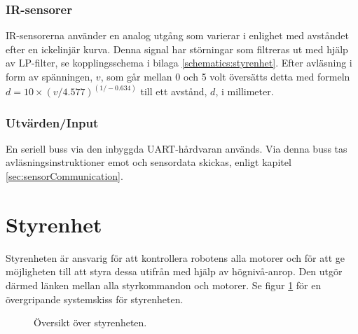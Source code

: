\documentclass[a4paper,11pt]{article}
\begin{document}
\subsubsection{IR-sensorer}
\label{ssec:ir_interface}
IR-sensorerna använder en analog utgång som varierar i enlighet med avståndet efter en ickelinjär kurva. Denna signal har störningar som filtreras ut med hjälp av LP-filter, se kopplingsschema i bilaga \ref{schematics:styrenhet}. Efter avläsning i form av spänningen, $v$, som går mellan 0 och 5 volt översätts detta med formeln $d = 10 \times (v/4.577) ^{(1/-0.634)}$ till ett avstånd, $d$, i millimeter.

\subsubsection{Utvärden/Input}
En seriell buss via den inbyggda UART-hårdvaran används. Via denna buss tas avläsningsinstruktioner emot och sensordata skickas, enligt kapitel \ref{sec:sensorCommunication}.

\clearpage
\section{Styrenhet} \label{sec:system2}
Styrenheten är ansvarig för att kontrollera robotens alla motorer och för att ge möjligheten till att styra dessa utifrån med hjälp av högnivå-anrop. Den utgör därmed länken mellan alla styrkommandon och motorer. Se figur \ref{fig:unitMotorcontroller} för en övergripande systemskiss för styrenheten.

\begin{figure}[h!]
    \caption{Översikt över styrenheten.}
    \label{fig:unitMotorcontroller}
\end{figure}
\end{document}
